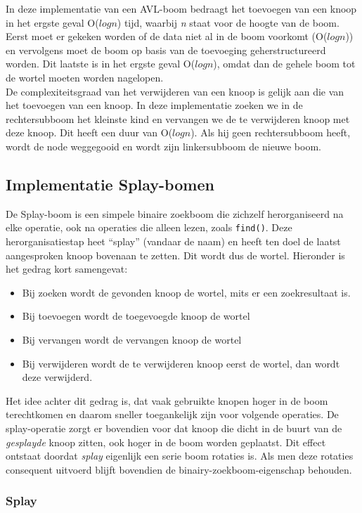 \documentclass[a4paper,10pt]{article}
\begin{document}
In deze implementatie van een AVL-boom bedraagt het toevoegen van een knoop in het ergste geval O($logn$) tijd, waarbij \emph{n} staat voor de hoogte van de boom. Eerst moet er gekeken worden of de data niet al in de boom voorkomt (O($logn$)) en vervolgens moet de boom op basis van de toevoeging geherstructureerd worden. Dit laatste is in het ergste geval O($logn$), omdat dan de gehele boom tot de wortel moeten worden nagelopen. \\

De complexiteitsgraad van het verwijderen van een knoop is gelijk aan die van het toevoegen van een knoop. In deze implementatie zoeken we in de rechtersubboom het kleinste kind en vervangen we de te verwijderen knoop met deze knoop. Dit heeft een duur van O($logn$). Als hij geen rechtersubboom heeft, wordt de node weggegooid en wordt zijn linkersubboom de nieuwe boom.
\subsection{Implementatie Splay-bomen}

De Splay-boom is een simpele binaire zoekboom die zichzelf herorganiseerd na elke operatie, ook na operaties die alleen lezen, zoals \texttt{find()}. Deze herorganisatiestap heet ``splay'' (vandaar de naam) en heeft ten doel de laatst aangesproken knoop bovenaan te zetten. Dit wordt dus de wortel. Hieronder is het gedrag kort samengevat:
\begin{itemize}
\item Bij zoeken wordt de gevonden knoop de wortel, mits er een zoekresultaat is.
\item Bij toevoegen wordt de toegevoegde knoop de wortel
\item Bij vervangen wordt de vervangen knoop de wortel
\item Bij verwijderen wordt de te verwijderen knoop eerst de wortel, dan wordt deze verwijderd.
\end{itemize}
Het idee achter dit gedrag is, dat vaak gebruikte knopen hoger in de boom terechtkomen en daarom sneller toegankelijk zijn voor volgende operaties. De splay-operatie zorgt er bovendien voor dat knoop die dicht in de buurt van de \emph{gesplayde} knoop zitten, ook hoger in
de boom worden geplaatst. Dit effect ontstaat doordat \emph{splay} eigenlijk een serie boom rotaties is. Als men deze rotaties
consequent uitvoerd blijft bovendien de binairy-zoekboom-eigenschap behouden.

\subsubsection{Splay}
\end{document}
